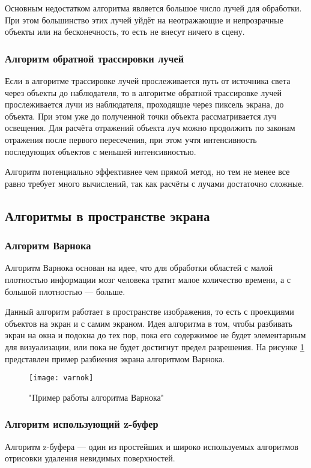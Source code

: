 Основным недостатком алгоритма является большое число лучей для обработки. При этом большинство этих лучей уйдёт на неотражающие и непрозрачные объекты или на бесконечность, то есть не внесут ничего в сцену.

\subsubsection{Алгоритм обратной трассировки лучей}
Если в алгоритме трассировке лучей прослеживается путь от источника света через объекты до наблюдателя, то в алгоритме обратной трассировке лучей прослеживается лучи из наблюдателя, проходящие через пиксель экрана, до объекта. При этом уже до полученной точки объекта рассматривается луч освещения. Для расчёта отражений объекта луч можно продолжить по законам отражения после первого пересечения, при этом учтя интенсивность последующих объектов с меньшей интенсивностью.

Алгоритм потенциально эффективнее чем прямой метод, но тем не менее все равно требует много вычислений, так как расчёты с лучами достаточно сложные. \cite{rodgers}


\subsection{Алгоритмы в пространстве экрана}
\subsubsection{Алгоритм Варнока}

Алгоритм Варнока основан на идее, что для обработки областей с малой плотностью информации мозг человека тратит малое количество времени, а с большой плотностью — больше.

Данный алгоритм работает в пространстве изображения, то есть с проекциями объектов на экран и с самим экраном. Идея алгоритма в том, чтобы разбивать экран на окна и подокна до тех пор, пока его содержимое не будет элементарным для визуализации, или пока не будет достигнут предел разрешения. На рисунке \ref{fig:varnok} представлен пример разбиения экрана алгоритмом Варнока.

\begin{figure}[h]
	\centering
	\texttt{[image: varnok]}
	\caption{"Пример работы алгоритма Варнока"}
	\label{fig:varnok}
\end{figure}

\subsubsection{Алгоритм использующий z-буфер}
Алгоритм z-буфера — один из простейших и широко используемых алгоритмов отрисовки удаления невидимых поверхностей.


